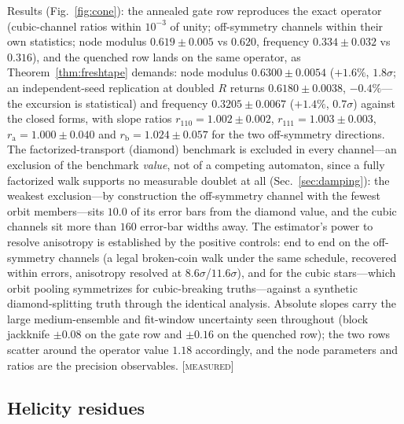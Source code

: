 \documentclass[aps,prd,twocolumn,superscriptaddress,nofootinbib,floatfix]{revtex4-2}
\newcommand{\evX}{\textnormal{\textsc{[measured]}}}
\begin{document}
Results (Fig.~\ref{fig:cone}): the annealed gate row reproduces the
exact operator (cubic-channel ratios within $10^{-3}$ of unity;
off-symmetry channels within their own statistics; node modulus
$0.619\pm0.005$ vs $0.620$, frequency $0.334\pm0.032$ vs $0.316$), and
the quenched row lands on the same
operator, as Theorem~\ref{thm:freshtape} demands: node modulus
$0.6300\pm0.0054$ ($+1.6\%$, $1.8\sigma$; an independent-seed
replication at doubled $R$ returns $0.6180\pm0.0038$, $-0.4\%$---the
excursion is statistical) and frequency
$0.3205\pm0.0067$ ($+1.4\%$, $0.7\sigma$) against the closed forms,
with slope ratios $r_{110}=1.002\pm0.002$, $r_{111}=1.003\pm0.003$,
$r_{\mathrm a}=1.000\pm0.040$ and $r_{\mathrm b}=1.024\pm0.057$ for the
two off-symmetry directions. The factorized-transport (diamond)
benchmark is excluded in every channel---an exclusion of the benchmark
\emph{value}, not of a competing automaton, since a fully factorized
walk supports no measurable doublet at all (Sec.~\ref{sec:damping}):
the weakest exclusion---by construction the off-symmetry channel with
the fewest orbit members---sits $10.0$ of its error bars from the
diamond value, and the cubic channels sit more than $160$ error-bar
widths away. The estimator's power to resolve anisotropy is established
by the positive controls: end to end on the off-symmetry channels (a
legal broken-coin walk under the same schedule, recovered within
errors, anisotropy resolved at $8.6\sigma$/$11.6\sigma$), and for the
cubic stars---which orbit pooling symmetrizes for cubic-breaking
truths---against a synthetic diamond-splitting truth through the
identical analysis. Absolute slopes carry the large medium-ensemble and
fit-window uncertainty seen throughout (block jackknife $\pm0.08$ on
the gate row and $\pm0.16$ on the quenched row); the
two rows scatter around the operator value $1.18$ accordingly, and the
node parameters and ratios are the precision observables. \evX{}

\subsection{Helicity residues}
\end{document}
